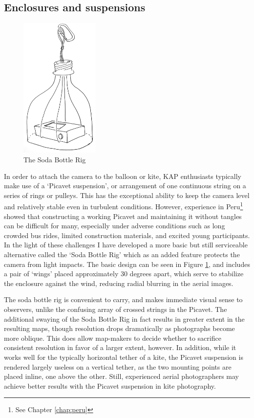 \documentclass[11pt]{report}
\begin{document}
\subsection{Enclosures and suspensions}
\label{subsec:cameraenclosures}

\begin{figure}
	\label{fig:soda}
	\begin{flushright}
		\includegraphics[width=0.35\textwidth]{images/soda-bottle-overview.jpg}
		\caption{The Soda Bottle Rig}
	\end{flushright}
\end{figure}

In order to attach the camera to the balloon or kite, \ac{KAP} enthusiasts typically make use of a `Picavet suspension', or arrangement of one continuous string on a series of rings or pulleys. This has the exceptional ability to keep the camera level and relatively stable even in turbulent conditions. However, experience in Peru\footnote{See Chapter \ref{chap:peru}} showed that constructing a working Picavet and maintaining it without tangles can be difficult for many, especially under adverse conditions such as long crowded bus rides, limited construction materials, and excited young participants. In the light of these challenges I have developed a more basic but still serviceable alternative called the `Soda Bottle Rig' which as an added feature protects the camera from light impacts. The basic design can be seen in Figure \ref{fig:soda}, and includes a pair of `wings' placed approximately 30 degrees apart, which serve to stabilize the enclosure against the wind, reducing radial blurring in the aerial images.

The soda bottle rig is convenient to carry, and makes immediate visual sense to observers, unlike the confusing array of crossed strings in the Picavet. The additional swaying of the Soda Bottle Rig in fact results in greater extent in the resulting maps, though resolution drops dramatically as photographs become more oblique. This does allow map-makers to decide whether to sacrifice consistent resolution in favor of a larger extent, however. In addition, while it works well for the typically horizontal tether of a kite, the Picavet suspension is rendered largely useless on a vertical tether, as the two mounting points are placed inline, one above the other. Still, experienced aerial photographers may achieve better results with the Picavet suspension in kite photography.  
\end{document}
